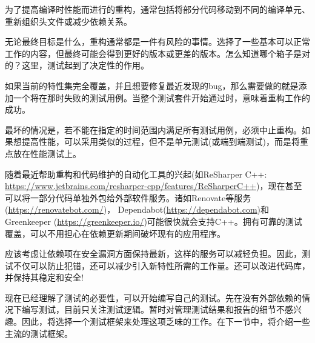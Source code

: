 为了提高编译时性能而进行的重构，通常包括将部分代码移动到不同的编译单元、重新组织头文件或减少依赖关系。

无论最终目标是什么，重构通常都是一件有风险的事情。选择了一些基本可以正常工作的内容，但最终可能会得到更好的版本或更差的版本。怎么知道哪个箱子是对的？这里，测试起到了决定性的作用。

如果当前的特性集完全覆盖，并且想要修复最近发现的bug，那么需要做的就是添加一个将在那时失败的测试用例。当整个测试套件开始通过时，意味着重构工作的成功。

最坏的情况是，若不能在指定的时间范围内满足所有测试用例，必须中止重构。如果想提高性能，可以采用类似的过程，但不是单元测试(或端到端测试)，而是将重点放在性能测试上。

随着最近帮助重构和代码维护的自动化工具的兴起(如ReSharper C++: \url{https://www.jetbrains.com/resharper-cpp/features/ReSharperC++})，现在甚至可以将一部分代码单独外包给外部软件服务。诸如Renovate等服务(\url{https://renovatebot.com/})， Dependabot(\url{https://dependabot.com})和Greenkeeper (\url{https://greenkeeper.io/})可能很快就会支持C++。拥有可靠的测试覆盖，可以不用担心在依赖更新期间破坏现有的应用程序。

应该考虑让依赖项在安全漏洞方面保持最新，这样的服务可以减轻负担。因此，测试不仅可以防止犯错，还可以减少引入新特性所需的工作量。还可以改进代码库，并保持其稳定和安全!

现在已经理解了测试的必要性，可以开始编写自己的测试。先在没有外部依赖的情况下编写测试，目前只关注测试逻辑。暂时对管理测试结果和报告的细节不感兴趣。因此，将选择一个测试框架来处理这项乏味的工作。在下一节中，将介绍一些主流的测试框架。















